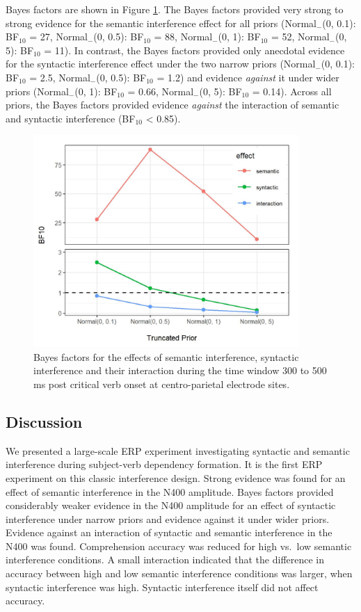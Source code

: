 \documentclass[a4paper, man, floatsintext]{apa7}
\begin{document}
Bayes factors are shown in Figure \ref{fig:eeg_bfs}. The Bayes factors provided very strong to strong evidence for the semantic interference effect for all priors 
(Normal$_{-}$(0, 0.1): BF$_{10}$ = 27,
Normal$_{-}$(0, 0.5): BF$_{10}$ = 88,
Normal$_{-}$(0, 1): BF$_{10}$ = 52,
Normal$_{-}$(0, 5): BF$_{10}$ = 11). In contrast, the Bayes factors provided only anecdotal evidence for the syntactic interference effect under the two narrow priors (Normal$_{-}$(0, 0.1): BF$_{10}$ = 2.5,
Normal$_{-}$(0, 0.5): BF$_{10}$ = 1.2) and evidence \textit{against} it under wider priors 
(Normal$_{-}$(0, 1): BF$_{10}$ = 0.66,
Normal$_{-}$(0, 5): BF$_{10}$ = 0.14). Across all priors, the Bayes factors provided evidence \textit{against} the interaction of semantic and syntactic interference (BF$_{10}$ < 0.85).


\begin{figure}
    \caption{Bayes factors for the effects of semantic interference, syntactic interference and their interaction during the time window 300 to 500 ms post critical verb onset at centro-parietal electrode sites.}
    \label{fig:eeg_bfs}
    \centering
    \includegraphics[width=0.9\textwidth]{images/BF_plot_N103_cp_300_500.jpg}
\end{figure}

\subsection{Discussion}
We presented a large-scale ERP experiment investigating syntactic and semantic interference during subject-verb dependency formation. It is the first ERP experiment on this classic interference design. Strong evidence was found for an effect of semantic interference in the N400 amplitude. Bayes factors provided considerably weaker evidence in the N400 amplitude for an effect of syntactic interference under narrow priors and evidence against it under wider priors. Evidence against an interaction of syntactic and semantic interference in the N400 was found. Comprehension accuracy was reduced for high vs.\ low semantic interference conditions. A small interaction indicated that the difference in accuracy between high and low semantic interference conditions was larger, when syntactic interference was high. Syntactic interference itself did not affect accuracy.
\end{document}
